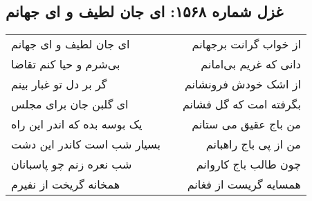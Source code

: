 \begin{center}
\section*{غزل شماره ۱۵۶۸: ای جان لطیف و ای جهانم}
\label{sec:1568}
\begin{longtable}{l p{0.5cm} r}
ای جان لطیف و ای جهانم
&&
از خواب گرانت برجهانم
\\
بی‌شرم و حیا کنم تقاضا
&&
دانی که غریم بی‌امانم
\\
گر بر دل تو غبار بینم
&&
از اشک خودش فرونشانم
\\
ای گلبن جان برای مجلس
&&
بگرفته امت که گل فشانم
\\
یک بوسه بده که اندر این راه
&&
من باج عقیق می ستانم
\\
بسیار شب است کاندر این دشت
&&
من از پی باج راهبانم
\\
شب نعره زنم چو پاسبانان
&&
چون طالب باج کاروانم
\\
همخانه گریخت از نفیرم
&&
همسایه گریست از فغانم
\\
\end{longtable}
\end{center}

